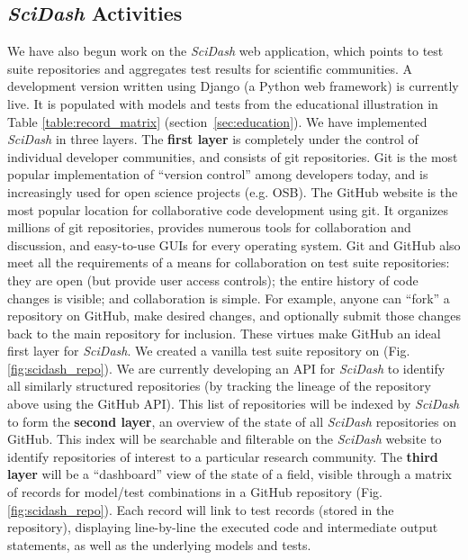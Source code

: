 \documentclass[11pt,letterpaper]{article}
\begin{document}
\subsection{\textit{SciDash} Activities}\label{sec:scidash_activities}
We have also begun work on the \textit{SciDash} web application, which points to test suite repositories and aggregates test results for scientific communities. A development version written using Django (a Python web framework) is currently live\cite{scidash_url}.  It is populated with models and tests from the educational illustration in Table \ref{table:record_matrix} (section~\ref{sec:education}).  We have implemented \textit{SciDash} in three layers.
The \textbf{first layer} is completely under the control of individual developer communities, and consists of git repositories.  Git is the most popular implementation of ``version control'' among developers today\cite{ram_git_2013}, and is increasingly used for open science projects (e.g. OSB\cite{osb_url}).  The GitHub website\cite{github_url} is the most popular location for collaborative code development using git.  It organizes millions of git repositories, provides numerous tools for collaboration and discussion, and easy-to-use GUIs for every operating system.  Git and GitHub also meet all the requirements of a means for collaboration on test suite repositories: they are open (but provide user access controls); the entire history of code changes is visible; and collaboration is simple.  For example, anyone can ``fork'' a repository on GitHub, make desired changes, and optionally submit those changes back to the main repository for inclusion.  These virtues make GitHub an ideal first layer for \textit{SciDash}.  We created a vanilla test suite repository\cite{scidash_repo_url} on  (Fig. \ref{fig:scidash_repo}).  We are currently developing an API for \textit{SciDash} to identify all similarly structured repositories (by tracking the lineage of the repository above using the GitHub API).
This list of repositories will be indexed by \textit{SciDash} to form the \textbf{second layer}, an overview of the state of all \textit{SciDash} repositories on GitHub.  This index will be searchable and filterable on the \textit{SciDash} website to identify repositories of interest to a particular research community.  
The \textbf{third layer} will be a ``dashboard'' view of the state of a field, visible through a matrix of records for model/test combinations in a GitHub repository (Fig. \ref{fig:scidash_repo}).  Each record will link to test records (stored in the repository), displaying line-by-line the executed code and intermediate output statements, as well as the underlying models and tests.   
\end{document}
